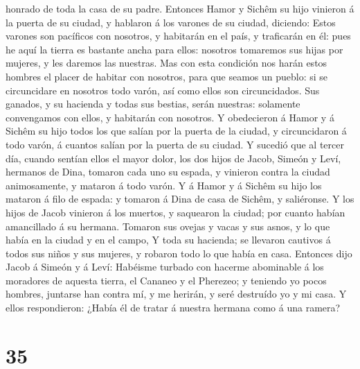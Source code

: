 honrado de toda la casa de su padre.  Entonces Hamor y
Sichêm su hijo vinieron á la puerta de su ciudad, y hablaron á los
varones de su ciudad, diciendo:  Estos varones son
pacíficos con nosotros, y habitarán en el país, y traficarán en él: pues
he aquí la tierra es bastante ancha para ellos: nosotros tomaremos sus
hijas por mujeres, y les daremos las nuestras.  Mas con
esta condición nos harán estos hombres el placer de habitar con
nosotros, para que seamos un pueblo: si se circuncidare en nosotros todo
varón, así como ellos son circuncidados.  Sus ganados, y
su hacienda y todas sus bestias, serán nuestras: solamente convengamos
con ellos, y habitarán con nosotros.  Y obedecieron á
Hamor y á Sichêm su hijo todos los que salían por la puerta de la
ciudad, y circuncidaron á todo varón, á cuantos salían por la puerta de
su ciudad.  Y sucedió que al tercer día, cuando sentían
ellos el mayor dolor, los dos hijos de Jacob, Simeón y Leví, hermanos de
Dina, tomaron cada uno su espada, y vinieron contra la ciudad
animosamente, y mataron á todo varón.  Y á Hamor y á
Sichêm su hijo los mataron á filo de espada: y tomaron á Dina de casa de
Sichêm, y saliéronse.  Y los hijos de Jacob vinieron á
los muertos, y saquearon la ciudad; por cuanto habían amancillado á su
hermana.  Tomaron sus ovejas y vacas y sus asnos, y lo
que había en la ciudad y en el campo,  Y toda su
hacienda; se llevaron cautivos á todos sus niños y sus mujeres, y
robaron todo lo que había en casa.  Entonces dijo Jacob á
Simeón y á Leví: Habéisme turbado con hacerme abominable á los moradores
de aquesta tierra, el Cananeo y el Pherezeo; y teniendo yo pocos
hombres, juntarse han contra mí, y me herirán, y seré destruído yo y mi
casa.  Y ellos respondieron: ¿Había él de tratar á
nuestra hermana como á una ramera?

\hypertarget{section-34}{%
\section{35}\label{section-34}}

